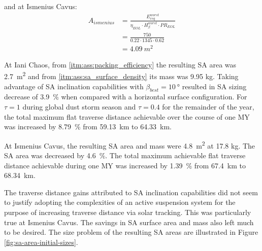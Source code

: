 and at Ismenius Cavus:
\begin{align}
  \label{calc:solar_cell_area_ismenius_cavus}
  A_{ismenius} &= \frac{E_{req}^{worst}}{\eta_{EOL} \cdot H_{\beta}^{worst} \cdot PR_{EOL}}\\
               &= \frac{750}{0.22 \cdot 1345 \cdot 0.62}\\
               &= \SI{4.09}{m^{2}}
\end{align}

At Iani Chaos, from \ref{itm:ass:packing_efficiency} the resulting \ac{SA} area was \SI{2.7}{m^{2}} and from \ref{itm:ass:sa_surface_density} its mass was 9.95 \si{\kilo\gram}. Taking advantage of \ac{SA} inclination capabilities with $\beta_{best} = \SI{10}{\degree}$ resulted in \ac{SA} sizing decrease of \SI{3.9}{\percent} when compared with a horizontal surface configuration. For $\tau = 1$ during global dust storm season and $\tau = 0.4$ for the remainder of the year, the total maximum flat traverse distance achievable over the course of one \ac{MY} was increased by \SI{8.79}{\percent} from \SI{59.13}{\kilo\meter} to \SI{64.33}{\kilo\meter}.

At Ismenius Cavus, the resulting \ac{SA} area and mass were \SI{4.8}{m^{2}} at 17.8 \si{\kilo\gram}. The \ac{SA} area was decreased by \SI{4.6}{\percent}. The total maximum achievable flat traverse distance achievable during one \ac{MY} was increased by \SI{1.39}{\percent} from \SI{67.4}{\kilo\meter} to \SI{68.34}{\kilo\meter}.

The traverse distance gains attributed to \ac{SA} inclination capabilities did not seem to justify adopting the complexities of an active suspension system for the purpose of increasing traverse distance via solar tracking. This was particularly true at Ismenius Cavus. The savings in \ac{SA} surface area and mass also left much to be desired. The size problem of the resulting \ac{SA} areas are illustrated in Figure \ref{fig:sa-area-initial-sizes}.

